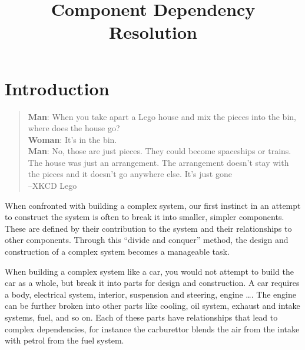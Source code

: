 \documentclass[a4paper]{report}
\title{Component Dependency Resolution}
\begin{document}

{}\tableofcontents

\chapter{Introduction}


\begin{quotation}
\textbf{Man}: When you take apart a Lego house and mix the pieces into the bin, where does the house go?\\
\textbf{Woman}: It's in the bin.\\
\textbf{Man}: No, those are just pieces. They could become spaceships or trains. 
The house was just an arrangement. The arrangement doesn't stay with the pieces and it doesn't go anywhere else. It's just gone\\
--XKCD Lego
\end{quotation}

{}When confronted with building a complex system, our first instinct in an attempt to construct the system is often to break it into smaller, simpler components. 
{}These are defined by their contribution to the system and their relationships to other components.
{}Through this ``divide and conquer'' method, the design and construction of a complex system becomes a manageable task.

When building a complex system like a car, you would not attempt to build the car as a whole, but break it into parts for design and construction.
A car requires a body, electrical system, interior, suspension and steering, engine \ldots. 
The engine can be further broken into other parts like cooling, oil system, exhaust and intake systems, fuel, and so on.
Each of these parts have relationships that lead to complex dependencies, for instance the carburettor blends the air from the intake with petrol from the fuel system.
\end{document}
